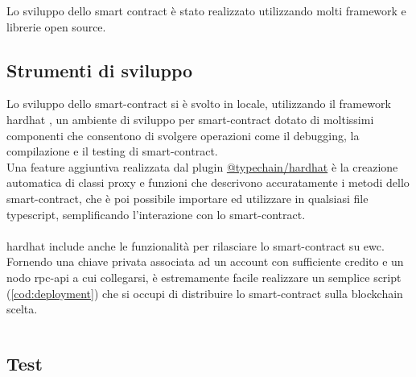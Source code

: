Lo sviluppo dello smart contract è stato realizzato utilizzando molti framework e librerie open source.

\subsection{Strumenti di sviluppo}

Lo sviluppo dello \gls{smart-contract} si è svolto in locale, utilizzando il framework hardhat \cite{sftw:hardhat},
un ambiente di sviluppo per \gls{smart-contract} dotato di moltissimi componenti
che consentono di svolgere operazioni come il debugging, la compilazione e il testing di \gls{smart-contract}. \\
Una feature aggiuntiva realizzata dal plugin \href{https://www.npmjs.com/package/@typechain/hardhat}{@typechain/hardhat} \cite{sftw:typechain_hardhat} è la creazione automatica di
classi proxy e funzioni che descrivono accuratamente i metodi dello \gls{smart-contract},
che è poi possibile importare ed utilizzare in qualsiasi file typescript, semplificando l'interazione con lo \gls{smart-contract}. \\
\\
hardhat include anche le funzionalità per rilasciare lo \gls{smart-contract} su \gls{ewc}. \\
Fornendo una chiave privata associata ad un account con sufficiente credito e un nodo \gls{rpc-api} a cui collegarsi,
è estremamente facile realizzare un semplice script (\autoref{cod:deployment}) che si occupi di distribuire lo \gls{smart-contract} sulla blockchain scelta.

\inputminted{typescript}{../contracts/scripts/deployAggregatorContract.ts}

\subsection{Test}

